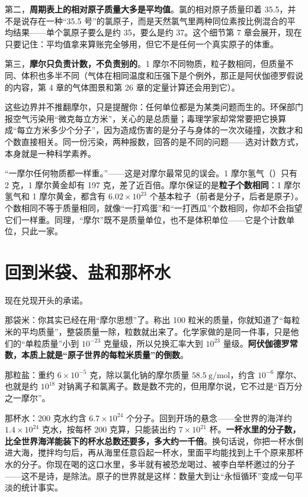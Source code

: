第二，\textbf{周期表上的相对原子质量大多是平均值}。氯的相对原子质量印着 35.5，并不是说存在一种“35.5 号”的氯原子，而是天然氯气里两种同位素按比例混合的平均结果——单个氯原子要么是约 35，要么是约 37。这个细节第 7 章会展开，现在只要记住：平均值拿来算账完全够用，但它不是任何一个真实原子的体重。

第三，\textbf{摩尔只负责计数，不负责别的}。1 摩尔不同物质，粒子数相同，但质量不同、体积也多半不同（气体在相同温度和压强下是个例外，那正是阿伏伽德罗假说的内容，第 4 章的气体图景和第 26 章的定量计算还会用到它）。

这些边界并不推翻摩尔，只是提醒你：任何单位都是为某类问题而生的。环保部门报空气污染用“微克每立方米”，关心的是总质量；毒理学家却常常要把它换算成“每立方米多少个分子”，因为造成伤害的是分子与身体的一次次碰撞，次数才和个数直接相关。同一份污染，两种报数，回答的是不同的问题——选对计数方式，本身就是一种科学素养。

\begin{wuqu}
“一摩尔任何物质都一样重。”——这是对摩尔最常见的误会。1 摩尔氢气（）只有 2 克，1 摩尔黄金却有 197 克，差了近百倍。摩尔保证的是\textbf{粒子个数相同}：1 摩尔氢气和 1 摩尔黄金，都含有 $6.02\times 10^{23}$ 个基本粒子（前者是分子，后者是原子）。个数相同不等于质量相同，就像“一打鸡蛋”和“一打西瓜”个数相同，你却不会指望它们一样重。同理，“摩尔”既不是质量单位，也不是体积单位——它是个计数单位，只此一家。
\end{wuqu}

\section{回到米袋、盐和那杯水}

现在兑现开头的承诺。

那袋米：你其实已经在用“摩尔思想”了。称出 100 粒米的质量，你就知道了“每粒米的平均质量”，整袋质量一除，粒数就出来了。化学家做的是同一件事，只是他们的“单粒质量”小到 $10^{-23}$ 克量级，所以兑换汇率大到 $10^{23}$ 量级。\textbf{阿伏伽德罗常数，本质上就是“原子世界的每粒米质量”的倒数}。

那粒盐：重约 $6\times 10^{-5}$ 克，除以氯化钠的摩尔质量 $58.5\ \mathrm{g/mol}$，约含 $10^{-6}$ 摩尔、也就是约 $10^{18}$ 对钠离子和氯离子。数是数不完的，但用摩尔说，它不过是“百万分之一摩尔”。

那杯水：200 克水约含 $6.7\times 10^{24}$ 个分子。回到开场的悬念——全世界的海洋约 $1.4\times 10^{24}$ 克水，按每杯 200 克算，只能装出约 $7\times 10^{21}$ 杯。\textbf{一杯水里的分子数，比全世界海洋能装下的杯水总数还要多，多大约一千倍}。换句话说，你把一杯水倒进大海，搅拌均匀后，再从海里任意舀起一杯水，里面平均能找到上千个原来那杯水的分子。你现在喝的这口水里，多半就有被恐龙喝过、被李白举杯邀过的分子——这不是诗，是除法。原子的世界就是这样：数量大到让“永恒循环”变成一句平淡的统计事实。

